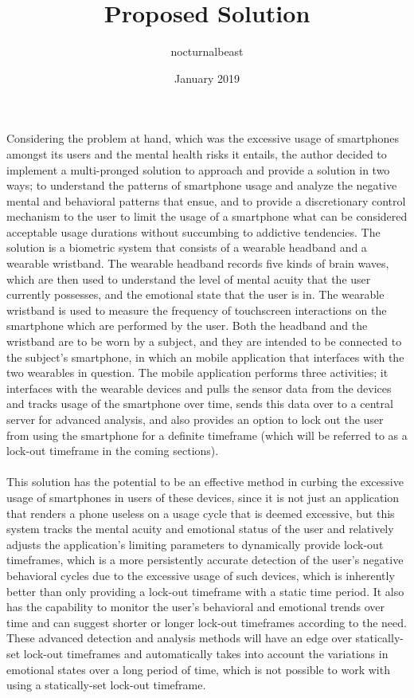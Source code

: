 \documentclass{article}
\title{Proposed Solution}
\author{nocturnalbeast}
\date{January 2019}
\begin{document}
\maketitle

\paragraph{} Considering the problem at hand, which was the excessive usage of smartphones amongst its users and the mental health risks it entails, the author decided to implement a multi-pronged solution to approach and provide a solution in two ways; to understand the patterns of smartphone usage and analyze the negative mental and behavioral patterns that ensue, and to provide a discretionary control mechanism to the user to limit the usage of a smartphone what can be considered acceptable usage durations without succumbing to addictive tendencies. The solution is a biometric system that consists of a wearable headband and a wearable wristband. The wearable headband records five kinds of brain waves, which are then used to understand the level of mental acuity that the user currently possesses, and the emotional state that the user is in. The wearable wristband is used to measure the frequency of touchscreen interactions on the smartphone which are performed by the user. Both the headband and the wristband are to be worn by a subject, and they are intended to be connected to the subject's smartphone, in which an mobile application that interfaces with the two wearables in question. The mobile application performs three activities; it interfaces with the wearable devices and pulls the sensor data from the devices and tracks usage of the smartphone over time, sends this data over to a central server for advanced analysis, and also provides an option to lock out the user from using the smartphone for a definite timeframe (which will be referred to as a lock-out timeframe in the coming sections).

\paragraph{} This solution has the potential to be an effective method in curbing the excessive usage of smartphones in users of these devices, since it is not just an application that renders a phone useless on a usage cycle that is deemed excessive, but this system tracks the mental acuity and emotional status of the user and relatively adjusts the application's limiting parameters to dynamically provide lock-out timeframes, which is a more persistently accurate detection of the user's negative behavioral cycles due to the excessive usage of such devices, which is inherently better than only providing a lock-out timeframe with a static time period. It also has the capability to monitor the user's behavioral and emotional trends over time and can suggest shorter or longer lock-out timeframes according to the need. These advanced detection and analysis methods will have an edge over statically-set lock-out timeframes and automatically takes into account the variations in emotional states over a long period of time, which is not possible to work with using a statically-set lock-out timeframe.
\end{document}
